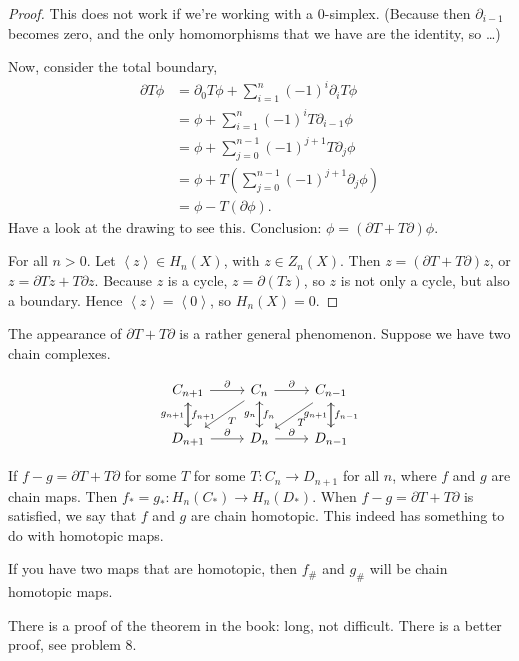 \begin{proof}
This does not work if we're working with a $0$-simplex.
(Because then $\partial_{i-1}$ becomes zero, and the only homomorphisms that we have are the identity, so \ldots)

Now, consider the total boundary,
\begin{align*}
    \partial T \phi &= \partial_0 T \phi + \sum_{i=1}^{n} (-1)^{i} \partial_i T \phi\\
                    &= \phi + \sum_{i=1}^{n} (-1)^{i} T\partial_{i-1} \phi\\
                    &= \phi + \sum_{j=0}^{n-1} (-1)^{j+1} T\partial_{j} \phi\\
                    &= \phi + T\left(\sum_{j=0}^{n-1} (-1)^{j+1} \partial_{j} \phi\right)\\
                    &= \phi - T( \partial \phi)
.\end{align*}
Have a look at the drawing to see this.
Conclusion: $\phi = (\partial T + T \partial) \phi$.

For all $n > 0$.
Let $ \left<z \right> \in H_n(X)$, with $z \in Z_n(X)$.
Then $z = (\partial T + T \partial) z$, or $z = \partial T z+ T \partial z$. Because  $z$ is a cycle, $z = \partial(T z)$, so  $z$ is not only a cycle, but also a boundary. 
Hence $\left<z \right> = \left<0 \right>$, so $H_n(X) = 0$.
\end{proof}

\begin{remark}
    The appearance of $\partial T + T \partial$ is a rather general phenomenon.
    Suppose we have two chain complexes.

    \[
        \begin{tikzcd}
            C_{n+1} \arrow[r, "\partial"] \arrow[d, "f_{n+1}"]& C_n \arrow[dl, "T"] \arrow[r, "\partial"] \arrow[d, "f_n"]& C_{n-1} \arrow[dl, "T"] \arrow[d, "f_{n-1}"]\\
            D_{n+1} \arrow[r, "\partial"] \arrow[u, "g_{n+1}"]& D_n \arrow[u, "g_n"]\arrow[r, " \partial"] & D_{n-1} \arrow[u, "g_{n+1}"]
        \end{tikzcd}
    \]

    If $f - g = \partial T +  T \partial$ for some $T$ for some $T: C_n \to  D_{n+1}$ for all $n$, where $f$ and $g$ are chain maps.
    Then $f_* = g_*: H_n(C_*) \to  H_n(D_*)$.
    When $f - g = \partial T + T \partial$ is satisfied, we say that $f$ and $g$ are chain homotopic.
    This indeed has something to do with homotopic maps.
    
    If you have two maps that are homotopic, then $f_\#$ and $g_\#$ will be chain homotopic maps.

    There is a proof of the theorem in the book: long, not difficult.
    There is a better proof, see problem 8.
\end{remark}

